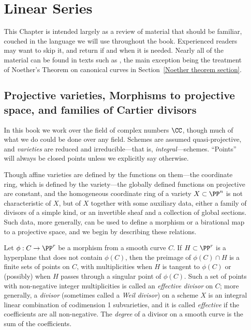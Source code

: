 

\chapter{Linear Series}\label{linear series}\label{linear series}
This Chapter is intended largely as a review of material that should be familiar, couched in the language we will use throughout the book. Experienced readers 
may want to skip it, and return if and when it is needed. Nearly all of the material can be found in texts such as \cite{H}, the main exception being the treatment of
Noether's Theorem on canonical curves in Section~\ref{Noether theorem section}.

\section{Projective varieties, Morphisms to projective space, and families of Cartier divisors}

In this book we work over the field of complex numbers $\CC$, though much of what we do
could be done over any field. 
Schemes are assumed quasi-projective, and \emph{varieties} are reduced and irreducible---that is, \emph{integral}---schemes. ``Points'' will always be closed points unless we explicitly say otherwise.

Though affine varieties are defined by the functions on them---the coordinate ring, which is defined by the variety---the globally defined functions on projective are constant, and
the homogeneous coordinate ring of a variety $X\subset \PP^n$ is not characteristic of $X$, but of $X$ together with some auxiliary data, 
either a family of divisors of a simple kind, or an invertible sheaf and a collection of global sections. Such data, more generally, can be used to define a morphism or a birational map
to a projective space, and we begin by describing these relations.

Let $\phi: C\to \PP^{r}$ be a morphism from a smooth curve $C$. If $H\subset \PP^r$ is a hyperplane that does not contain $\phi(C)$, then the preimage of $\phi(C)\cap H$ is a finite sets of points on $C$, with multiplicities when $H$ is tangent to $\phi(C)$ or (possibly) when $H$ passes through a singular point of $\phi(C)$. Such a set of points with non-negative integer multiplicities is called an \emph{effective divisor} on $C$; more generally, a \emph{divisor} (sometimes called a \emph{Weil divisor}) on a scheme $X$ is an integral linear combination of codimension 1 subvarieties, and it is called \emph{effective} if the coefficients are all non-negative. The \emph{degree} of a divisor on a smooth curve
is the sum of the coefficients. 


